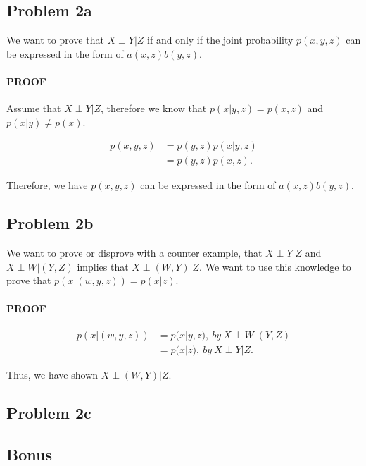 \documentclass[paper=a4, fontsize=11pt]{scrartcl} %
\begin{document}
\subsection{Problem 2a}
We want to prove that $X \perp Y|Z$ if and only if the joint probability $p(x,y,z)$ can be expressed in the form of $a(x,z)b(y,z)$.
\paragraph{PROOF}
Assume that $X \perp Y|Z$, therefore we know that $p(x|y,z) = p(x,z)$ and $p(x|y) \neq p(x)$.

\begin{align}
p(x,y,z) &= p(y,z)p(x|y,z) \\
&= p(y,z)p(x,z).
\end{align}

Therefore, we have $p(x,y,z)$ can be expressed in the form of $a(x,z)b(y,z)$.

\subsection{Problem 2b}
 We want to prove or disprove with a counter example, that $X \perp Y|Z$ and $X \perp W|(Y,Z)$ implies that $X \perp (W,Y)|Z$.
We want to use this knowledge to prove that $p(x|(w,y,z)) = p(x|z)$.

\paragraph{PROOF}
\begin{align}
p(x|(w,y,z)) &= p(x|y,z),\ by \ X \perp W|(Y,Z) \\
&= p(x|z), \ by \  X \perp Y|Z.
\end{align}

Thus, we have shown $X \perp (W,Y)|Z$.

\subsection{Problem 2c}

\subsection{Bonus}

\end{document}
